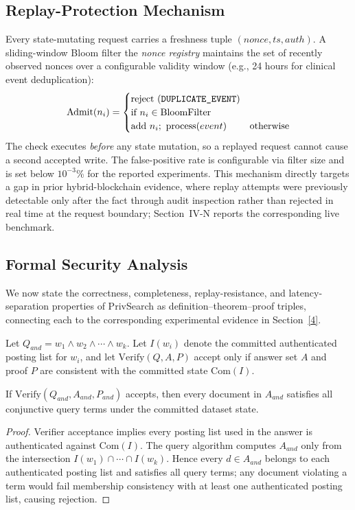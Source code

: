 \subsection{Replay-Protection Mechanism}
\label{3D}
Every state-mutating request carries a freshness tuple $(nonce, ts, auth)$. A sliding-window Bloom filter the \emph{nonce registry} maintains the set of recently observed nonces over a configurable validity window (e.g., 24 hours for clinical event deduplication):
\begin{equation}
\mathrm{Admit}(n_i)=
\begin{cases}
\text{reject (\texttt{DUPLICATE\_EVENT})} & \\ \text{if } n_i \in \mathrm{BloomFilter} \\
\text{add } n_i;\ \text{process}(event) & \text{otherwise}
\end{cases}
\end{equation}
The check executes \emph{before} any state mutation, so a replayed request cannot cause a second accepted write. The false-positive rate is configurable via filter size and is set below $10^{-3}$\% for the reported experiments. This mechanism directly targets a gap in prior hybrid-blockchain evidence, where replay attempts were previously detectable only after the fact through audit inspection rather than rejected in real time at the request boundary; Section~IV-N reports the corresponding live benchmark.

\subsection{Formal Security Analysis}
\label{3E}
We now state the correctness, completeness, replay-resistance, and latency-separation properties of PrivSearch as definition--theorem--proof triples, connecting each to the corresponding experimental evidence in Section~\ref{4}.

\begin{definition}
Let $Q_{and}=w_1 \wedge w_2 \wedge \cdots \wedge w_k$. Let $I(w_i)$ denote the committed authenticated posting list for $w_i$, and let $\mathrm{Verify}(Q,A,P)$ accept only if answer set $A$ and proof $P$ are consistent with the committed state $\mathrm{Com}(I)$.
\end{definition}

\begin{theorem}
\label{thm:conj_correct}
If $\mathrm{Verify}(Q_{and},A_{and},P_{and})$ accepts, then every document in $A_{and}$ satisfies all conjunctive query terms under the committed dataset state.
\end{theorem}
\begin{proof}
Verifier acceptance implies every posting list used in the answer is authenticated against $\mathrm{Com}(I)$. The query algorithm computes $A_{and}$ only from the intersection $I(w_1)\cap\cdots\cap I(w_k)$. Hence every $d\in A_{and}$ belongs to each authenticated posting list and satisfies all query terms; any document violating a term would fail membership consistency with at least one authenticated posting list, causing rejection.
\end{proof}

